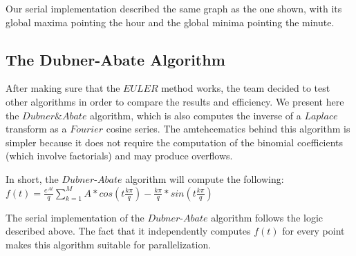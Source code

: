 Our serial implementation described the same graph as the one shown, with its global maxima pointing the hour and the global minima pointing the minute.


\subsection{The Dubner-Abate Algorithm}
After making sure that the $EULER$ method works, the team decided to test other algorithms in order to compare the results and efficiency.
We present here the $Dubner \& Abate$ algorithm, which is also computes the inverse of a $Laplace$ transform as a $Fourier$ cosine series.
The amtehcematics behind this algorithm is simpler because it does not require the computation of the binomial coefficients (which involve factorials)
and may produce overflows.

In short, the $Dubner$-$Abate$ algorithm will compute the following:
$f(t) = \frac{e^{At}}{q} \sum\limits_{k=1}^{M} {A* cos(t\frac{k\pi}{q}) - \frac{k\pi}{q}* sin(t\frac{k\pi}{q}) }$


The  serial implementation of the $Dubner$-$Abate$ algorithm follows the logic described above. The fact that 
it independently computes $f(t)$  for every point makes this algorithm suitable for parallelization.








